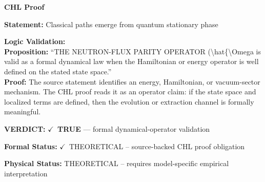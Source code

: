 \vspace{0.45em}
\noindent\textbf{CHL Proof}\par
\textbf{Statement:} Classical paths emerge from quantum stationary phase

\textbf{Logic Validation:}\\
\textbf{Proposition:} ``THE NEUTRON-FLUX PARITY OPERATOR (\textbackslash{}hat\{\textbackslash{}Omega is valid as a formal dynamical law when
the Hamiltonian or energy operator is well defined on the stated state space.''\\
\textbf{Proof:} The source statement identifies an energy, Hamiltonian, or vacuum-sector mechanism. The
CHL proof reads it as an operator claim: if the state space and localized terms are
defined, then the evolution or extraction channel is formally meaningful.

\textbf{VERDICT:} \ensuremath{\checkmark}\ \textbf{TRUE} --- formal dynamical-operator validation

\textbf{Formal Status:} \ensuremath{\checkmark}\ THEORETICAL -- source-backed CHL proof obligation

\textbf{Physical Status:} THEORETICAL -- requires model-specific empirical interpretation
\par\vspace{0.45em}
\par
\ifTZPDarkEdition
{}
\fi
\endgroup
\endgroup
